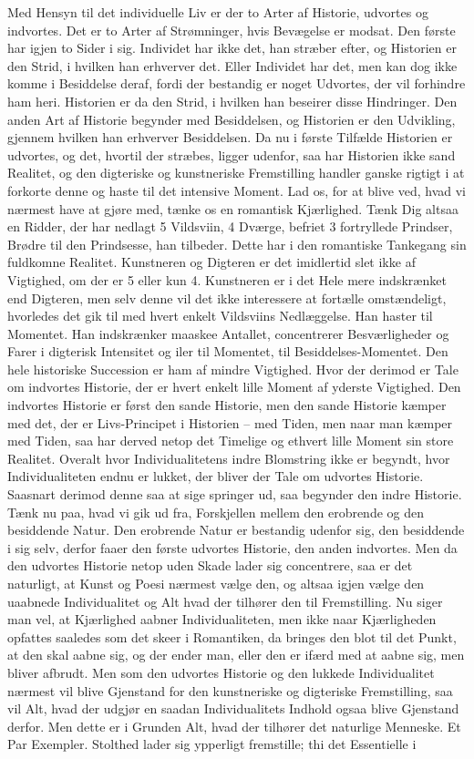 \documentclass[12pt,a4paper]{article}
\begin{document}
Med Hensyn til det individuelle Liv er der to Arter af Historie, udvortes og indvortes. Det er to Arter af Strømninger, hvis Bevægelse er modsat. Den første har igjen to Sider i sig. Individet har ikke det, han stræber efter, og Historien er den Strid, i hvilken han erhverver det. Eller Individet har det, men kan dog ikke komme i Besiddelse deraf, fordi der bestandig er noget Udvortes, der vil forhindre ham heri. Historien er da den Strid, i hvilken han beseirer disse Hindringer. Den anden Art af Historie begynder med Besiddelsen, og Historien er den Udvikling, gjennem hvilken han erhverver Besiddelsen. Da nu i første Tilfælde Historien er udvortes, og det, hvortil der stræbes, ligger udenfor, saa har Historien ikke sand Realitet, og den digteriske og kunstneriske Fremstilling handler ganske rigtigt i at forkorte denne og haste til det intensive Moment. Lad os, for at blive ved, hvad vi nærmest have at gjøre med, tænke os en romantisk Kjærlighed. Tænk Dig altsaa en Ridder, der har nedlagt 5 Vildsviin, 4 Dværge, befriet 3 fortryllede Prindser, Brødre til den Prindsesse, han tilbeder. Dette har i den romantiske Tankegang sin fuldkomne Realitet. Kunstneren og Digteren er det imidlertid slet ikke af Vigtighed, om der er 5 eller kun 4. Kunstneren er i det Hele mere indskrænket end Digteren, men selv denne vil det ikke interessere at fortælle omstændeligt, hvorledes det gik til med hvert enkelt Vildsviins Nedlæggelse. Han haster til Momentet. Han indskrænker maaskee Antallet, concentrerer Besværligheder og Farer i digterisk Intensitet og iler til Momentet, til Besiddelses-Momentet. Den hele historiske Succession er ham af mindre Vigtighed. Hvor der derimod er Tale om indvortes Historie, der er hvert enkelt lille Moment af yderste Vigtighed. Den indvortes Historie er først den sande Historie, men den sande Historie kæmper med det, der er Livs-Principet i Historien – med Tiden, men naar man kæmper med Tiden, saa har derved netop det Timelige og ethvert lille Moment sin store Realitet. Overalt hvor Individualitetens indre Blomstring ikke er begyndt, hvor Individualiteten endnu er lukket, der bliver der Tale om udvortes Historie. Saasnart derimod denne saa at sige springer ud, saa begynder den indre Historie. Tænk nu paa, hvad vi gik ud fra, Forskjellen mellem den erobrende og den besiddende Natur. Den erobrende Natur er bestandig udenfor sig, den besiddende i sig selv, derfor faaer den første udvortes Historie, den anden indvortes. Men da den udvortes Historie netop uden Skade lader sig concentrere, saa er det naturligt, at Kunst og Poesi nærmest vælge den, og altsaa igjen vælge den uaabnede Individualitet og Alt hvad der tilhører den til Fremstilling. Nu siger man vel, at Kjærlighed aabner Individualiteten, men ikke naar Kjærligheden opfattes saaledes som det skeer i Romantiken, da bringes den blot til det Punkt, at den skal aabne sig, og der ender man, eller den er ifærd med at aabne sig, men bliver afbrudt. Men som den udvortes Historie og den lukkede Individualitet nærmest vil blive Gjenstand for den kunstneriske og digteriske Fremstilling, saa vil Alt, hvad der udgjør en saadan Individualitets Indhold ogsaa blive Gjenstand derfor. Men dette er i Grunden Alt, hvad der tilhører det naturlige Menneske. Et Par Exempler. Stolthed lader sig ypperligt fremstille; thi det Essentielle i 
\end{document}
